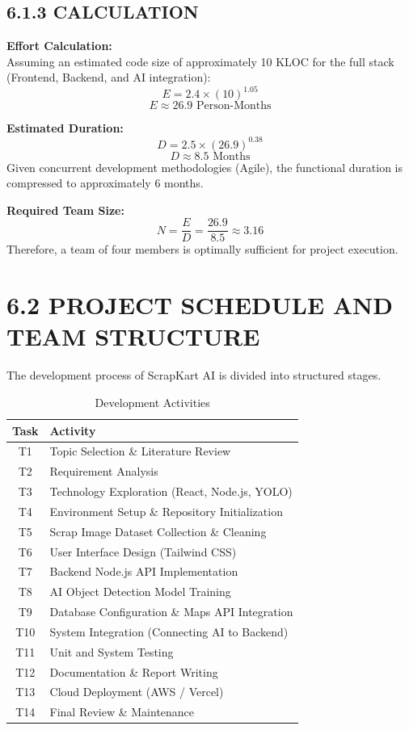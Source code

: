 \subsection{6.1.3 CALCULATION}
\textbf{Effort Calculation:}\\
Assuming an estimated code size of approximately 10 KLOC for the full stack (Frontend, Backend, and AI integration):
\[ E = 2.4 \times (10)^{1.05} \]
\[ E \approx 26.9 \text{ Person-Months} \]

\textbf{Estimated Duration:}\\
\[ D = 2.5 \times (26.9)^{0.38} \]
\[ D \approx 8.5 \text{ Months} \]
Given concurrent development methodologies (Agile), the functional duration is compressed to approximately 6 months.

\textbf{Required Team Size:}\\
\[ N = \frac{E}{D} = \frac{26.9}{8.5} \approx 3.16 \]
Therefore, a team of four members is optimally sufficient for project execution.

\section{6.2 PROJECT SCHEDULE AND TEAM STRUCTURE}

The development process of ScrapKart AI is divided into structured stages.

\begin{table}[H]
\centering
\caption{Development Activities}
\renewcommand{\arraystretch}{1.5}
\begin{tabular}{|c|l|}
\hline
\textbf{Task} & \textbf{Activity}\\
\hline
T1 & Topic Selection \& Literature Review\\
T2 & Requirement Analysis\\
T3 & Technology Exploration (React, Node.js, YOLO)\\
T4 & Environment Setup \& Repository Initialization\\
T5 & Scrap Image Dataset Collection \& Cleaning\\
T6 & User Interface Design (Tailwind CSS)\\
T7 & Backend Node.js API Implementation\\
T8 & AI Object Detection Model Training\\
T9 & Database Configuration \& Maps API Integration\\
T10 & System Integration (Connecting AI to Backend)\\
T11 & Unit and System Testing\\
T12 & Documentation \& Report Writing\\
T13 & Cloud Deployment (AWS / Vercel)\\
T14 & Final Review \& Maintenance\\
\hline
\end{tabular}
\end{table}

